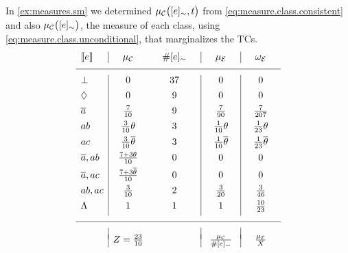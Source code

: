 \documentclass[x11names]{tlp}
\begin{document}
\ifExamples
	\begin{example}\label{ex:choerent.probability}\em

		In \cref{ex:measures.sm} we determined $\pwc{\class{e}, t}$ from
		\cref{eq:measure.class.consistent} and also $\pwc{\class{e}}$, the measure of
		each class, using \cref{eq:measure.class.unconditional}, that marginalizes
		the \aclp{TC}.
		\begin{equation*}
			\begin{array}{l|cc|c|c}
				\stablecore{e}
				       & \hspace{1em}\pwC\hspace{1em}
				       & \hspace{1em}\#\class{e}\hspace{1em}
				       & \hspace{1em}\pwE\hspace{1em}
				       & \hspace{1em}\wgtE\hspace{1em}
				\\
				\hline
				\inconsistent
				       & 0
				       & 37
				       & 0
				       & 0
				\\[4pt]
				\indepclass
				       & 0
				       & 9
				       & 0
				       & 0
				\\[4pt]
				\co{a}
				       & \frac{7}{10}
				       & 9
				       & \frac{7}{90}
				       & \frac{7}{207}
				\\[4pt]
				ab     & \frac{3}{10}\theta                  & 3 & \frac{1}{10}\theta      & \frac{1}{23}\theta \\[4pt]
				ac     & \frac{3}{10}\co{\theta}             & 3 & \frac{1}{10}\co{\theta} &
				\frac{1}{23}\co{\theta}                                                                         \\[4pt]
				\co{a}, ab
				       & \frac{7 + 3\theta}{10}
				       & 0
				       & 0
				       & 0
				\\[4pt]
				\co{a}, ac
				       & \frac{7 + 3\co{\theta}}{10}
				       & 0
				       & 0
				       & 0
				\\[4pt]
				ab, ac & \frac{3}{10}                        & 2 & \frac{3}{20}            & \frac{3}{46}       \\[4pt]
				\consequenceclass
				       & 1
				       & 1
				       & 1
				       & \frac{10}{23}
				\\[4pt]
				\hline
				       &
				       &
				       &
				       &
				\\[-0.5em]
				       & Z = \frac{23}{10}
				       &
				       & \frac{\pwC}{\#\class{e}}
				       & \frac{\pwE}{X}
			\end{array}
		\end{equation*}


\end{example}
\end{document}
